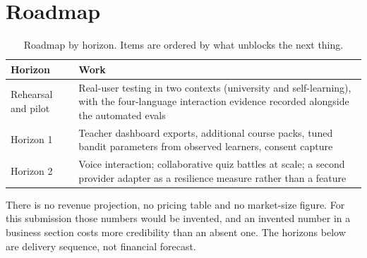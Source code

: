 \section{Roadmap}

\begin{table}[htbp]
\centering
\caption{Roadmap by horizon. Items are ordered by what unblocks the next thing.}
\label{tab:roadmap}
\footnotesize
\begin{tabularx}{\textwidth}{@{}p{2.4cm}X@{}}
\toprule
\textbf{Horizon} & \textbf{Work} \\
\midrule
Rehearsal and pilot & Real-user testing in two contexts (university and self-learning),
  with the four-language interaction evidence recorded alongside the automated evals \\
Horizon 1 & Teacher dashboard exports, additional course packs, tuned bandit parameters from
  observed learners, consent capture \\
Horizon 2 & Voice interaction; collaborative quiz battles at scale; a second provider
  adapter as a resilience measure rather than a feature \\
\bottomrule
\end{tabularx}
\end{table}

\begin{note}
There is no revenue projection, no pricing table and no market-size figure. For this
submission those numbers would be invented, and an invented number in a business section
costs more credibility than an absent one.
The horizons below are delivery sequence, not financial forecast.
\end{note}
